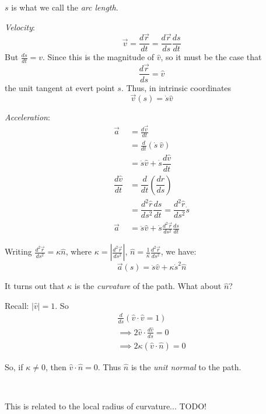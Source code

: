 \documentclass[10pt]{scrartcl}
\begin{document}
\begin{definition} $s$ is what we call the \emph{arc length}. 

\emph{Velocity}:
\[\vec{v} = \frac{d\vec{r}}{dt} = \frac{d\vec{r}}{ds}\frac{ds}{dt}\]
But $\displaystyle{\frac{ds}{dt} = v}$. Since this is the magnitude of $\hat{v}$, so it must be the case that \[\displaystyle{\frac{d\vec{r}}{ds} = \hat{v}}\] the unit tangent at evert point $s$. Thus, in intrinsic coordinates
\[\boxed{\vec{v}(s) = \dot{s}\hat{v}}\]

\emph{Acceleration}: \[\begin{aligned}
	\vec{a} &= \frac{d\vec{v}}{dt}\\ &= \frac{d}{dt}\left(\dot{s}~ \hat{v}\right)\\
	&= \ddot{s}\hat{v} + \dot{s}\dfrac{d\hat{v}}{dt}\\
\dfrac{d\hat{v}}{dt} &= \dfrac{d}{dt}\left(\dfrac{d\hat{r}}{ds}\right)\\
&= \dfrac{d^2\hat{r}}{ds^2}\dfrac{ds}{dt} = \dfrac{d^2\hat{r}}{ds^2}\dot{s}\\
	\vec{a} &= \ddot{s}\hat{v} + \dot{s}\frac{d^2\vec{r}}{ds^2}\frac{ds}{dt}\end{aligned}
\]

Writing $\displaystyle{\frac{d^2\vec{r}}{ds^2} = \kappa \hat{n}}$, where $\displaystyle{\kappa =\left|\frac{d^2\vec{r}}{ds^2}\right| }$, $\hat{n} = \displaystyle{\frac{1}{\kappa}\frac{d^2\vec{r}}{ds^2}}$, we have: 
\[\boxed{\vec{a}(s) = \ddot{s}\hat{v} + \kappa \dot{s}^2\hat{n}}\]

It turns out that $\kappa$ is the \emph{curvature} of the path. What about $\hat{n}$?

Recall: $|\hat{v}| = 1 $. So 
\[\begin{aligned}\frac{d}{ds}(\hat{v}\cdot\hat{v} = 1)\\
 \implies 2\hat{v}\cdot\frac{d\hat{v}}{ds} = 0\\
 \implies 2\kappa(\hat{v}\cdot\hat{n}) = 0	
\end{aligned}
\]

So, if $\kappa \neq 0$, then $\hat{v}\cdot \hat{n} = 0$. Thus $\hat{n}$ is the \emph{unit normal} to the path.
\end{definition}~

This is related to the local radius of curvature... TODO!\\
\end{document}
